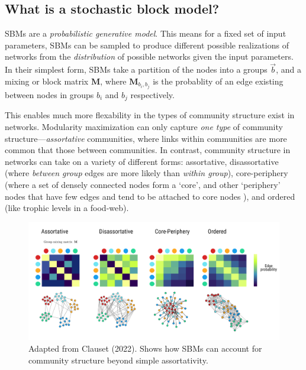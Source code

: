 \documentclass[
]{article}
\begin{document}
\hypertarget{what-is-a-stochastic-block-model}{%
\subsection{What is a stochastic block
model?}\label{what-is-a-stochastic-block-model}}

SBMs are a \emph{probabilistic generative model}. This means for a fixed
set of input parameters, SBMs can be sampled to produce different
possible realizations of networks from the \emph{distribution} of
possible networks given the input parameters. In their simplest form,
SBMs take a partition of the nodes into a groups \(\vec{b}\), and a
mixing or block matrix \(\mathbf{M}\), where \(\mathbf{M}_{b_i,b_j}\) is
the probablity of an edge existing between nodes in groups \(b_i\) and
\(b_j\) respectively.

This enables much more flexability in the types of community structure
exist in networks. Modularity maximization can only capture \emph{one
type} of community structure---\emph{assortative} communities, where
links within communities are more common that those between communities.
In contrast, community structure in networks can take on a variety of
different forms: assortative, disassortative (where \emph{between group}
edges are more likely than \emph{within group}), core-periphery (where a
set of densely connected nodes form a `core', and other `periphery'
nodes that have few edges and tend to be attached to core nodes ), and
ordered (like trophic levels in a food-web).

\begin{figure}

{\centering \includegraphics{./figures/blockmatrix.png}

}

\caption{Adapted from Clauset (2022). Shows how SBMs can account for
community structure beyond simple assortativity.}

\end{figure}
\end{document}
